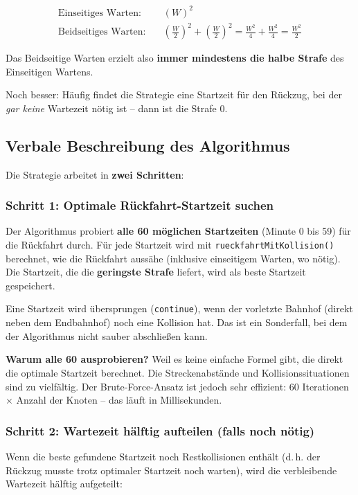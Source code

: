 \documentclass[12pt,a4paper]{article}
\begin{document}
\begin{align*}
\text{Einseitiges Warten:} & \quad (W)^2 \\
\text{Beidseitiges Warten:} & \quad \left(\frac{W}{2}\right)^2 + \left(\frac{W}{2}\right)^2 = \frac{W^2}{4} + \frac{W^2}{4} = \frac{W^2}{2}
\end{align*}

Das Beidseitige Warten erzielt also \textbf{immer mindestens die halbe Strafe} des Einseitigen Wartens.

Noch besser: Häufig findet die Strategie eine Startzeit für den Rückzug, bei der \emph{gar keine} Wartezeit nötig ist -- dann ist die Strafe 0.

\subsection{Verbale Beschreibung des Algorithmus}

Die Strategie arbeitet in \textbf{zwei Schritten}:

\subsubsection{Schritt 1: Optimale Rückfahrt-Startzeit suchen}

Der Algorithmus probiert \textbf{alle 60 möglichen Startzeiten} (Minute 0 bis 59) für die Rückfahrt durch. Für jede Startzeit wird mit \texttt{rueckfahrtMitKollision()} berechnet, wie die Rückfahrt aussähe (inklusive einseitigem Warten, wo nötig). Die Startzeit, die die \textbf{geringste Strafe} liefert, wird als beste Startzeit gespeichert.

Eine Startzeit wird übersprungen (\texttt{continue}), wenn der vorletzte Bahnhof (direkt neben dem Endbahnhof) noch eine Kollision hat. Das ist ein Sonderfall, bei dem der Algorithmus nicht sauber abschließen kann.

\textbf{Warum alle 60 ausprobieren?} Weil es keine einfache Formel gibt, die direkt die optimale Startzeit berechnet. Die Streckenabstände und Kollisionssituationen sind zu vielfältig. Der Brute-Force-Ansatz ist jedoch sehr effizient: 60 Iterationen $\times$ Anzahl der Knoten -- das läuft in Millisekunden.

\subsubsection{Schritt 2: Wartezeit hälftig aufteilen (falls noch nötig)}

Wenn die beste gefundene Startzeit noch Restkollisionen enthält (d.\,h. der Rückzug musste trotz optimaler Startzeit noch warten), wird die verbleibende Wartezeit hälftig aufgeteilt:
\end{document}
